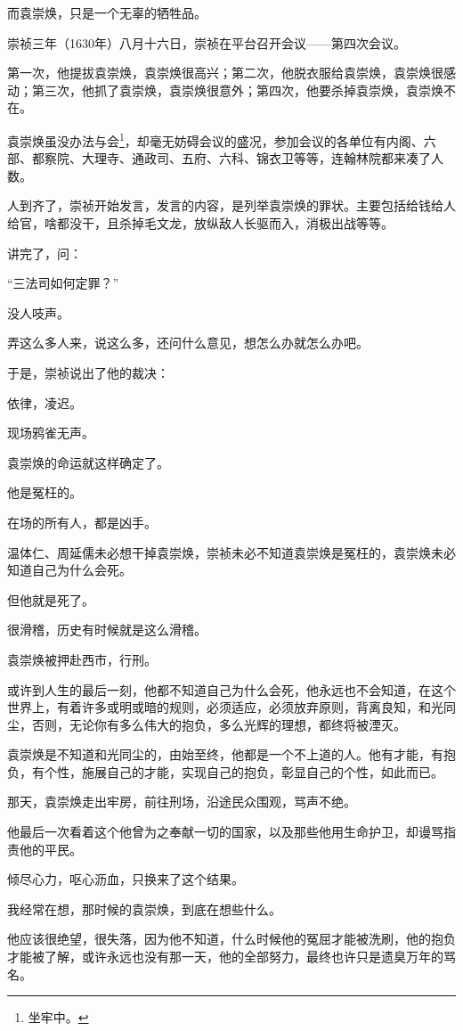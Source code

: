 \begin{multicols}{\theparacolNo}
而袁崇焕，只是一个无辜的牺牲品。

崇祯三年（1630年）八月十六日，崇祯在平台召开会议——第四次会议。

第一次，他提拔袁崇焕，袁崇焕很高兴；第二次，他脱衣服给袁崇焕，袁崇焕很感动；第三次，他抓了袁崇焕，袁崇焕很意外；第四次，他要杀掉袁崇焕，袁崇焕不在。

袁崇焕虽没办法与会\footnote{坐牢中。}，却毫无妨碍会议的盛况，参加会议的各单位有内阁、六部、都察院、大理寺、通政司、五府、六科、锦衣卫等等，连翰林院都来凑了人数。

人到齐了，崇祯开始发言，发言的内容，是列举袁崇焕的罪状。主要包括给钱给人给官，啥都没干，且杀掉毛文龙，放纵敌人长驱而入，消极出战等等。

讲完了，问：

“三法司如何定罪？”

没人吱声。

弄这么多人来，说这么多，还问什么意见，想怎么办就怎么办吧。

于是，崇祯说出了他的裁决：

依律，凌迟。

现场鸦雀无声。

袁崇焕的命运就这样确定了。

他是冤枉的。

在场的所有人，都是凶手。

温体仁、周延儒未必想干掉袁崇焕，崇祯未必不知道袁崇焕是冤枉的，袁崇焕未必知道自己为什么会死。

但他就是死了。

很滑稽，历史有时候就是这么滑稽。

袁崇焕被押赴西市，行刑。

或许到人生的最后一刻，他都不知道自己为什么会死，他永远也不会知道，在这个世界上，有着许多或明或暗的规则，必须适应，必须放弃原则，背离良知，和光同尘，否则，无论你有多么伟大的抱负，多么光辉的理想，都终将被湮灭。

袁崇焕是不知道和光同尘的，由始至终，他都是一个不上道的人。他有才能，有抱负，有个性，施展自己的才能，实现自己的抱负，彰显自己的个性，如此而已。

那天，袁崇焕走出牢房，前往刑场，沿途民众围观，骂声不绝。

他最后一次看着这个他曾为之奉献一切的国家，以及那些他用生命护卫，却谩骂指责他的平民。

倾尽心力，呕心沥血，只换来了这个结果。

我经常在想，那时候的袁崇焕，到底在想些什么。

他应该很绝望，很失落，因为他不知道，什么时候他的冤屈才能被洗刷，他的抱负才能被了解，或许永远也没有那一天，他的全部努力，最终也许只是遗臭万年的骂名。


\end{multicols}
